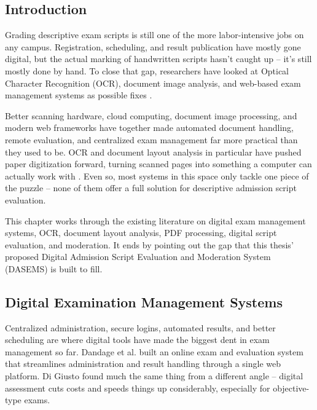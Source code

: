 
\vspace{0.5cm}

\subsection{Introduction}

Grading descriptive exam scripts is still one of the more labor-intensive jobs on any campus. Registration, scheduling, and result publication have mostly gone digital, but the actual marking of handwritten scripts hasn't caught up -- it's still mostly done by hand. To close that gap, researchers have looked at Optical Character Recognition (OCR), document image analysis, and web-based exam management systems as possible fixes \cite{article,inproceedings,8878791}.

Better scanning hardware, cloud computing, document image processing, and modern web frameworks have together made automated document handling, remote evaluation, and centralized exam management far more practical than they used to be. OCR and document layout analysis in particular have pushed paper digitization forward, turning scanned pages into something a computer can actually work with \cite{4376991,FRANCIS2025100532,docbank2020}. Even so, most systems in this space only tackle one piece of the puzzle -- none of them offer a full solution for descriptive admission script evaluation.

This chapter works through the existing literature on digital exam management systems, OCR, document layout analysis, PDF processing, digital script evaluation, and moderation. It ends by pointing out the gap that this thesis' proposed Digital Admission Script Evaluation and Moderation System (DASEMS) is built to fill.


\subsection{Digital Examination Management Systems}

Centralized administration, secure logins, automated results, and better scheduling are where digital tools have made the biggest dent in exam management so far. Dandage et al. \cite{inproceedings} built an online exam and evaluation system that streamlines administration and result handling through a single web platform. Di Giusto \cite{article} found much the same thing from a different angle -- digital assessment cuts costs and speeds things up considerably, especially for objective-type exams.

